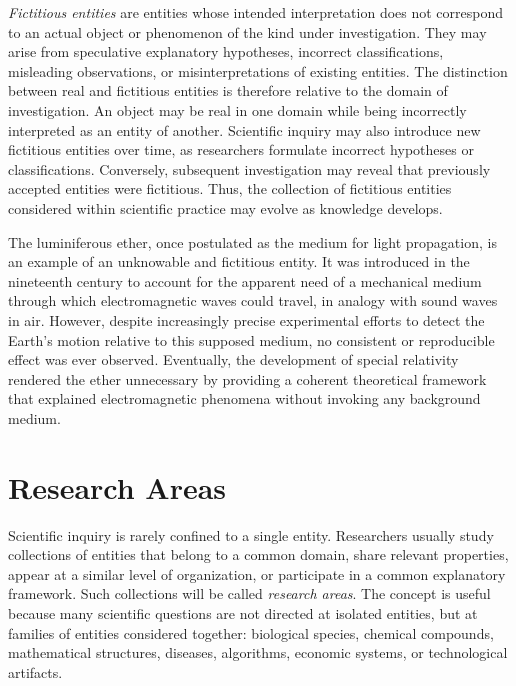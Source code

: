 \emph{Fictitious entities} are entities whose intended interpretation does not correspond to an actual object or phenomenon of the kind under investigation. They may arise from speculative explanatory hypotheses, incorrect classifications, misleading observations, or misinterpretations of existing entities. The distinction between real and fictitious entities is therefore relative to the domain of investigation. An object may be real in one domain while being incorrectly interpreted as an entity of another. Scientific inquiry may also introduce new fictitious entities over time, as researchers formulate incorrect hypotheses or classifications. Conversely, subsequent investigation may reveal that previously accepted entities were fictitious. Thus, the collection of fictitious entities considered within scientific practice may evolve as knowledge develops.

\begin{example}
\label{ex:luminiferous_ether}
The luminiferous ether, once postulated as the medium for light propagation, is an example of an unknowable and fictitious entity. It was introduced in the nineteenth century to account for the apparent need of a mechanical medium through which electromagnetic waves could travel, in analogy with sound waves in air. However, despite increasingly precise experimental efforts to detect the Earth's motion relative to this supposed medium, no consistent or reproducible effect was ever observed. Eventually, the development of special relativity rendered the ether unnecessary by providing a coherent theoretical framework that explained electromagnetic phenomena without invoking any background medium.
\end{example}

%
%

\section{Research Areas}
\label{sec:research_areas}

Scientific inquiry is rarely confined to a single entity. Researchers usually study collections of entities that belong to a common domain, share relevant properties, appear at a similar level of organization, or participate in a common explanatory framework. Such collections will be called \emph{research areas}. The concept is useful because many scientific questions are not directed at isolated entities, but at families of entities considered together: biological species, chemical compounds, mathematical structures, diseases, algorithms, economic systems, or technological artifacts.

